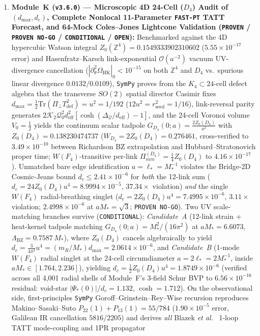 \documentclass[11pt,a4paper]{article}
\begin{document}
\begin{enumerate}
$3.60\sigma$ / $6.09\sigma$ for $\ell\in[30,1000]$ DES-like IA (\texttt{CONDITIONAL}; audited microscopically and upgraded to nonlocal 11-parameter \texttt{FAST-PT} + lightcone mocks in Module~K below).

\item \textbf{Module~K (\texttt{v3.6.0}) --- Microscopic 4D 24-Cell ($D_4$) Audit of $(d_{\max}, d_c)$, Complete Nonlocal 11-Parameter \texttt{FAST-PT} TATT Forecast, and 64-Mock Coles--Jones Lightcone Validation (\texttt{PROVEN} / \texttt{PROVEN NO-GO} / \texttt{CONDITIONAL} / \texttt{OPEN}):}
Benchmarked against the 4D hypercubic Watson integral $Z_0(\mathbb{Z}^4) = 0.1549333902310602$ ($5.55\times 10^{-17}$ error) and Hasenfratz--Karsch \cite{Capitani2003} link-exponential $\mathcal{O}(a^{-2})$ vacuum UV-divergence cancellation ($|\partial_\theta^2\Omega_{\mathrm{HK}}|_0 < 10^{-15}$ on both $\mathbb{Z}^4$ and $D_4$ vs.\ spurious linear divergence $0.0132 / 0.0109$), \texttt{SymPy} proves from the $K_4 \subset \text{24-cell}$ defect algebra that the transverse $SO(2)$ spatial director Casimir fixes $d_{\max} = \frac{1}{2}\mathrm{Tr}(\Pi_\perp T_{\mathrm{def}}^2) = u^2 = 1/192$ ($12 u^2 = r_{\mathrm{seed}}^2 = 1/16$), link-reversal parity generates $2\mathcal{K}_2\mathcal{Q}_0^2 d_{\mathrm{eff}}^2[\cosh(\Delta_{\mathcal{Q}}/d_{\mathrm{eff}}) - 1]$, and the 24-cell Voronoi volume $V_0 = \frac{1}{2}$ yields the continuum scalar tadpole $G_{D_4}(0;a) = \frac{2 Z_0(D_4)}{a^2}$ with $Z_0(D_4) = 0.138230474737$ ($W_{D_4} = 2 Z_0(D_4) = 0.276461$, cross-verified to $3.49\times 10^{-10}$ between Richardson BZ extrapolation and Hubbard--Stratonovich proper time; $W(F_4)$-transitive per-link $\Pi_{mm}^{(D_4)} = \frac{1}{4}Z_0(D_4)$ to $4.16\times 10^{-17}$). Unmatched bare edge identification $a = \ell_* = M_*^{-1}$ violates the Bridge-2D Cosmic-Jeans bound $d_c \le 2.41\times 10^{-6}$ for \emph{both} the 12-link sum ($d_c = 24 Z_0(D_4)u^4 = 8.9994\times 10^{-5}$, $37.34\times$ violation) \emph{and} the single $W(F_4)$ radial-breathing singlet ($d_c = 2 Z_0(D_4)u^4 = 7.4995\times 10^{-6}$, $3.11\times$ violation; $2.4998\times 10^{-6}$ at $a M_* = \sqrt{3}$; \texttt{PROVEN NO-GO}). Two UV scale-matching branches survive (\texttt{CONDITIONAL}): \emph{Candidate~A} (12-link strain + heat-kernel tadpole matching $G_{D_4}(0;a) = M_*^2/(16\pi^2)$ at $a M_* = 6.6073$, $\Lambda_{\mathrm{BZ}} = 0.7587\,M_*$), where $Z_0(D_4)$ cancels algebraically to yield $d_c = \frac{3}{4\pi^2}u^4 = (m_R/M_*)d_{\max} = 2.0614\times 10^{-6}$, and \emph{Candidate~B} (1-mode $W(F_4)$ radial singlet at the 24-cell circumdiameter $a = 2\ell_* = 2 M_*^{-1}$, inside $a M_*\in[1.764, 2.236]$), yielding $d_c = \frac{1}{2}Z_0(D_4)u^4 = 1.8749\times 10^{-6}$ (verified across all 4,001 radial shells of Module~F's 3-field Schur BVP to $6.56\times 10^{-16}$ residual: void-star $|\Psi_*(0)|/d_c = 1.132$, $\cosh = 1.712$). On the observational side, first-principles \texttt{SymPy} Goroff--Grinstein--Rey--Wise recursion reproduces Makino--Sasaki--Suto \cite{ColesJones1991} $P_{22}(1)+P_{13}(1) = 55/784$ ($1.90\times 10^{-5}$ error, Galilean IR cancellation $5816/2205$) and derives \emph{all} Blazek \textit{et al.}\ \cite{Blazek2019} 1-loop TATT mode-coupling and 1PR propagator 
\end{enumerate}
\end{document}
